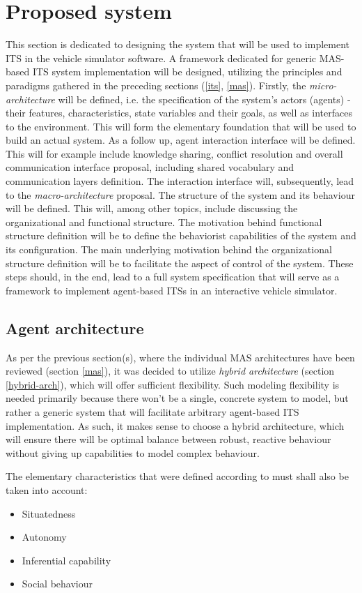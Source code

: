 \documentclass[main.tex]{subfiles}
\begin{document}
    
\section{Proposed system}\label{sec-system}

This section is dedicated to designing the system that will be used to implement ITS in the
vehicle simulator software. A framework dedicated for generic MAS-based ITS system
implementation will be designed, utilizing the principles and paradigms gathered in the
preceding sections (\ref{its}, \ref{mas}). Firstly, the \emph{micro-architecture} will be
defined, i.e. the specification of the system's actors (agents) - their features,
characteristics, state variables and their goals, as well as interfaces to the environment.
This will form the elementary foundation that will be used to build an actual system. As a
follow up, agent interaction interface will be defined. This will for example include
knowledge sharing, conflict resolution and overall communication interface proposal, including
shared vocabulary and communication layers definition. The interaction interface will,
subsequently, lead to the \emph{macro-architecture} proposal. The structure of the system and
its behaviour will be defined. This will, among other topics, include discussing the
organizational and functional structure. The motivation behind functional structure definition
will be to define the behaviorist capabilities of the system and its configuration. The main
underlying motivation behind the organizational structure definition will be to facilitate the
aspect of control of the system. These steps should, in the end, lead to a full system
specification that will serve as a framework to implement agent-based ITSs in an interactive
vehicle simulator.

\subsection{Agent architecture}

As per the previous section(s), where the individual MAS architectures have been reviewed
(section \ref{mas}), it was decided to utilize \emph{hybrid architecture} (section
\ref{hybrid-arch}), which will offer sufficient flexibility. Such modeling flexibility is 
needed primarily because there won't be a single, concrete system to model, but rather a 
generic system that will facilitate arbitrary agent-based ITS implementation. As such, it 
makes sense to choose a hybrid architecture, which will ensure there will be optimal balance 
between robust, reactive behaviour without giving up capabilities to model complex behaviour.

The elementary characteristics that were defined according to \cite{ParasumannaGokulan2010}
must shall also be taken into account: 

\begin{itemize}
    \item Situatedness
    \item Autonomy 
    \item Inferential capability 
    \item Social behaviour 
\end{itemize}



\clearpage
\end{document}
